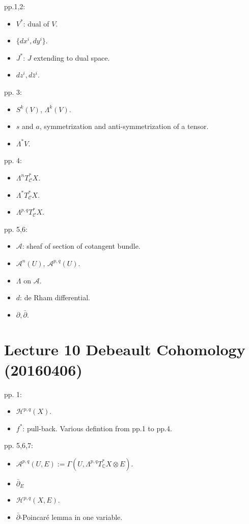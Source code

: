 \documentclass{book}
\numberwithin{equation}{subsection} %
\theoremstyle{definition}
\begin{document}
pp.1,2:
\begin{itemize}
    \item $V^*$: dual of $V$.
    \item $\{dx^i,dy^i\}$.
    \item $J^*$: $J$ extending to dual space.
    \item $dz^i,d\bar{z}^i$.
\end{itemize}
pp. 3:
\begin{itemize}
    \item $S^k(V)$, $\Lambda^k(V)$.
    \item $s$ and $a$, symmetrization and anti-symmetrization of a tensor.
    \item $\Lambda^* V$.
\end{itemize}
pp. 4:
\begin{itemize}
    \item $\Lambda^n T^*_{\mathcal{C}}X$.
    \item $\Lambda^* T^*_{\mathcal{C}}X$.
    \item $\Lambda^{p,q} T^*_{\mathcal{C}}X$.
\end{itemize}
pp. 5,6:
\begin{itemize}
    \item $\mathcal{A}$: sheaf of section of cotangent bundle.
    \item $\mathcal{A}^n(U)$, $\mathcal{A}^{p,q}(U)$.
    \item $\Lambda$ on $\mathcal{A}$.
    \item $d$: de Rham differential.
    \item $\partial, \bar{\partial}$.
\end{itemize}
	
\section{Lecture 10 Debeault Cohomology (20160406)}

pp. 1:
\begin{itemize}
    \item $\mathcal{H}^{p,q}(X)$.
    \item $f^*$: pull-back. Various defintion from pp.1 to pp.4.
\end{itemize}
pp. 5,6,7:
\begin{itemize}
    \item $\mathcal{A}^{p,q}(U,E):=\Gamma(U,\Lambda^{p,q}T_{\mathbb{C}}^* X \otimes E)$.
    \item $\bar{\partial}_E$
    \item $\mathcal{H}^{p,q}(X,E)$.
    \item $\bar{\partial}$-Poincaré lemma in one variable.
\end{itemize}
	
\end{document}
